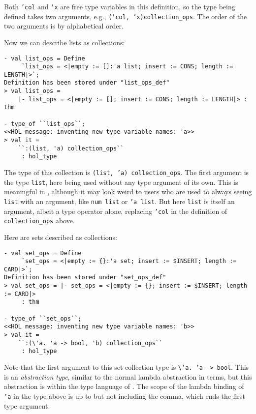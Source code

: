 Both \texttt{'col} and \texttt{'x} are free type variables in this definition, so
the type being defined takes two arguments, e.g., \texttt{('col, 'x)collection\_ops}.
The order of the two arguments is by alphabetical order.

Now we can describe lists as collections:
\begin{session}
\begin{verbatim}
- val list_ops = Define
     `list_ops = <|empty := []:'a list; insert := CONS; length := LENGTH|>`;
Definition has been stored under "list_ops_def"
> val list_ops =
    |- list_ops = <|empty := []; insert := CONS; length := LENGTH|> : thm

- type_of ``list_ops``;
<<HOL message: inventing new type variable names: 'a>>
> val it =
    ``:(list, 'a) collection_ops``
     : hol_type
\end{verbatim}
\end{session}
The type of this collection is \texttt{(list, 'a) collection\_ops}.
The first argument is the type \texttt{list}, here being used without any type argument
of its own.  This is meaningful in \HOLW{}, although it may look weird to \HOL{} users
who are used to always seeing \texttt{list} with an argument, like \texttt{num list} or
\texttt{'a list}.  But here \texttt{list} is itself an argument, albeit a type operator
alone, replacing \texttt{'col} in the definition of \texttt{collection\_ops} above.

Here are sets described as collections:
\begin{session}
\begin{verbatim}
- val set_ops = Define
     `set_ops = <|empty := {}:'a set; insert := $INSERT; length := CARD|>`;
Definition has been stored under "set_ops_def"
> val set_ops = |- set_ops = <|empty := {}; insert := $INSERT; length := CARD|>
     : thm

- type_of ``set_ops``;
<<HOL message: inventing new type variable names: 'b>>
> val it =
    ``:(\'a. 'a -> bool, 'b) collection_ops``
     : hol_type
\end{verbatim}
\end{session}
Note that the first argument to this set collection type is
\verb|\|\texttt{'a.~'a~->~bool}. This is an {\it abstraction type}, similar to
the normal lambda abstraction in terms, but this abstraction is within the type
language of \HOLW.  The scope of the lambda binding of \texttt{'a} in the type
above is up to but not including the comma, which ends the first type argument.

